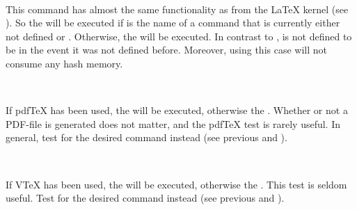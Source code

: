 \begin{Declaration}
  \\
\end{Declaration}
%
%
This command has almost the same functionality as  from
the \LaTeX{} kernel (see \cite{latex:source2e}). So the  will be executed if  is the name of a command
that is currently either not defined or . Otherwise, the
 will be executed. In contrast to
,  is not defined to be 
in the event it was not defined before. Moreover, using \eTeX{} this case will
not consume any hash memory.%
%
%
%


\begin{Declaration}
  \\
\end{Declaration}
%
%
If pdf\TeX{} has been used, the  will be executed,
otherwise the . Whether or not a PDF-file is
generated does not matter, and the pdf\TeX{} test is rarely useful. In
general, test for the desired command instead (see previous
 and ).
%
%
%


\begin{Declaration}
  \\
\end{Declaration}
%
%
If V\TeX{} has been used, the  will be executed,
otherwise the . This test is seldom useful. Test for
the desired command instead (see previous  and
).
%
%
%


